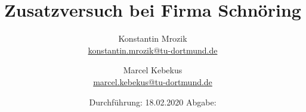 

\title{Zusatzversuch bei Firma Schnöring}
\author{%
  Konstantin Mrozik\\%
  \href{mailto:konstantin.mrozik@tu-dortmund.de}{konstantin.mrozik@tu-dortmund.de}%
  \and%
  Marcel Kebekus\\%
  \href{mailto:marcel.kebekus@tu-dortmund.de}{marcel.kebekus@tu-dortmund.de}%
}
\date{%
  Durchführung: 18.02.2020
  \hspace{3em}
  Abgabe: 
}
\publishers{TU Dortmund – Fakultät Physik}
\makeatletter         
\def\@maketitle{
\raggedright
\texttt{[image: bilder/lo\_TU-Do 2008/logo\_rgb\_jpg]}\\[8ex]
\begin{center}
{\Huge \bfseries \sffamily \@title }\\[4ex] 
{\Large  \@author}\\[4ex] 
\@date\\[8ex]
\publishers\\
\end{center}}
\makeatother





\maketitle
\thispagestyle{empty}
\tableofcontents
\newpage




\newpage
\printbibliography


